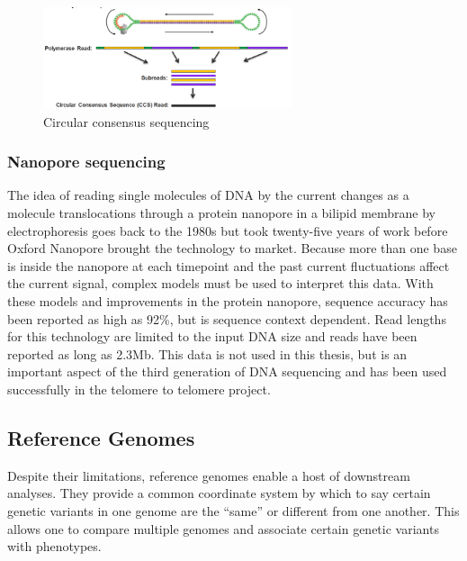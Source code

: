 \begin{figure}[htbp!]
\caption{Circular consensus sequencing}
\label{figure:ccs}
\begin{centering}
\includegraphics[width=0.65\textwidth]{CCS.png}
\end{centering}
\end{figure}

\subsubsection{Nanopore sequencing}

\par{
The idea of reading single molecules of DNA by the current changes as a molecule translocations through a protein nanopore in a bilipid membrane by electrophoresis goes back to the 1980s\cite{nanopore1} but took twenty-five years of work before Oxford Nanopore brought the technology to market\cite{nanopore2}\cite{nanopore3}. Because more than one base is inside the nanopore at each timepoint and the past current fluctuations affect the current signal, complex models must be used to interpret this data\cite{nanocall}\cite{deepnano}. With these models and improvements in the protein nanopore, sequence accuracy has been reported as high as 92\%, but is sequence context dependent. Read lengths for this technology are limited to the input DNA size and reads have been reported as long as 2.3Mb\cite{longlong}\cite{ultralong2}. This data is not used in this thesis, but is an important aspect of the third generation of DNA sequencing and has been used successfully in the telomere to telomere project\cite{T2T2}.
}

\subsection{Reference Genomes}

\par{
Despite their limitations, reference genomes enable a host of downstream analyses. They provide a common coordinate system by which to say certain genetic variants in one genome are the ``same'' or different from one another. This allows one to compare multiple genomes and associate certain genetic variants with phenotypes.
}

